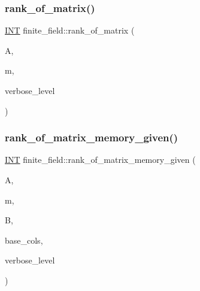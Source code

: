 \subsubsection{\texorpdfstring{rank\+\_\+of\+\_\+matrix()}{rank\_of\_matrix()}}
{\footnotesize\ttfamily \mbox{\hyperlink{galois_8h_a09fddde158a3a20bd2dcadb609de11dc}{I\+NT}} finite\+\_\+field\+::rank\+\_\+of\+\_\+matrix (\begin{DoxyParamCaption}\item[{\mbox{\hyperlink{galois_8h_a09fddde158a3a20bd2dcadb609de11dc}{I\+NT}} $\ast$}]{A,  }\item[{\mbox{\hyperlink{galois_8h_a09fddde158a3a20bd2dcadb609de11dc}{I\+NT}}}]{m,  }\item[{\mbox{\hyperlink{galois_8h_a09fddde158a3a20bd2dcadb609de11dc}{I\+NT}}}]{verbose\+\_\+level }\end{DoxyParamCaption})}

\mbox{\label{classfinite__field_a52f3b31ffe0b3cad48c79ffe464f6017}} 
\subsubsection{\texorpdfstring{rank\+\_\+of\+\_\+matrix\+\_\+memory\+\_\+given()}{rank\_of\_matrix\_memory\_given()}}
{\footnotesize\ttfamily \mbox{\hyperlink{galois_8h_a09fddde158a3a20bd2dcadb609de11dc}{I\+NT}} finite\+\_\+field\+::rank\+\_\+of\+\_\+matrix\+\_\+memory\+\_\+given (\begin{DoxyParamCaption}\item[{\mbox{\hyperlink{galois_8h_a09fddde158a3a20bd2dcadb609de11dc}{I\+NT}} $\ast$}]{A,  }\item[{\mbox{\hyperlink{galois_8h_a09fddde158a3a20bd2dcadb609de11dc}{I\+NT}}}]{m,  }\item[{\mbox{\hyperlink{galois_8h_a09fddde158a3a20bd2dcadb609de11dc}{I\+NT}} $\ast$}]{B,  }\item[{\mbox{\hyperlink{galois_8h_a09fddde158a3a20bd2dcadb609de11dc}{I\+NT}} $\ast$}]{base\+\_\+cols,  }\item[{\mbox{\hyperlink{galois_8h_a09fddde158a3a20bd2dcadb609de11dc}{I\+NT}}}]{verbose\+\_\+level }\end{DoxyParamCaption})}

